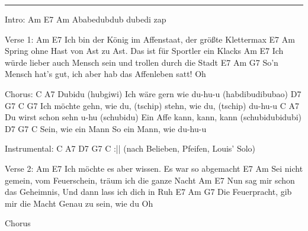 \noindent\rule{\columnwidth}{1pt}

\begin{lstsong}
Intro:
Am          E7     Am
Ababedubdub dubedi zap

Verse 1:
    Am                                             E7
Ich bin der König im Affenstaat, der größte Klettermax
    E7                                                    Am
Spring ohne Hast von Ast zu Ast. Das ist für Sportler ein Klacks
    Am                                                  E7
Ich würde lieber auch Mensch sein und trollen durch die Stadt
     E7                                            Am        G7
So’n Mensch hat’s gut, ich aber hab das Affenleben satt!     Oh
 
Chorus:
C                                  A7
Dubidu (hubgiwi) Ich wäre gern wie du-hu-u (habdibudibubao)
           D7                     G7                      C       G7
Ich möchte gehn, wie du, (tschip) stehn, wie du, (tschip) du-hu-u
               C                             A7
Du wirst schon sehn u-hu (schubidu) Ein Affe kann, kann, kann 
(schubidubidubi)
      D7           G7               C
Sein, wie ein Mann So ein Mann, wie du-hu-u
 
Instrumental: C  A7  D7  G7  C   :|| (nach Belieben, Pfeifen, Louis' Solo)

Verse 2:
    Am                                   E7
Ich möchte es aber wissen. Es war so abgemacht
    E7                                                 Am
Sei nicht gemein, vom Feuerschein, träum ich die ganze Nacht
    Am                                                     E7
Nun sag mir schon das Geheimnis, Und dann lass ich dich in Ruh
    E7                                                Am    G7
Die Feuerpracht, gib mir die Macht Genau zu sein, wie du    Oh

Chorus
\end{lstsong}
\newpage



